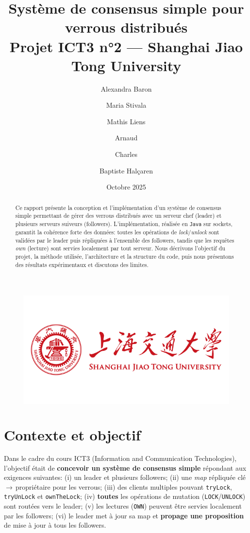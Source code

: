 \documentclass[a4paper,11pt]{article}
\title{Système de consensus simple pour verrous distribués\\\large Projet ICT3 n°2 — Shanghai Jiao Tong University}
\author{Alexandra Baron \and Maria Stivala \and Mathis Liens \and Arnaud \and Charles \and Baptiste Halçaren}
\date{Octobre 2025}
\begin{document}
\begin{figure}[H]
\centering
\includegraphics[width=0.55\linewidth]{shanghai-jiao-tong-university.png}
\end{figure}

\maketitle

\begin{abstract}
Ce rapport présente la conception et l'implémentation d'un système de consensus simple permettant de gérer des verrous distribués avec un serveur chef (leader) et plusieurs serveurs suiveurs (followers). L'implémentation, réalisée en \texttt{Java} sur sockets, garantit la cohérence forte des données: toutes les opérations de \emph{lock}/\emph{unlock} sont validées par le leader puis répliquées à l'ensemble des followers, tandis que les requêtes \emph{own} (lecture) sont servies localement par tout serveur. Nous décrivons l'objectif du projet, la méthode utilisée, l'architecture et la structure du code, puis nous présentons des résultats expérimentaux et discutons des limites.
\end{abstract}

\section{Contexte et objectif}
Dans le cadre du cours ICT3 (Information and Communication Technologies), l'objectif était de \textbf{concevoir un système de consensus simple} répondant aux exigences suivantes: (i) un leader et plusieurs followers; (ii) une \textit{map} répliquée clé\,$\rightarrow$\,propriétaire pour les verrous; (iii) des clients multiples pouvant \texttt{tryLock}, \texttt{tryUnLock} et \texttt{ownTheLock}; (iv) \textbf{toutes} les opérations de mutation (\texttt{LOCK}/\texttt{UNLOCK}) sont routées vers le leader; (v) les lectures (\texttt{OWN}) peuvent être servies localement par les followers; (vi) le leader met à jour sa map et \textbf{propage une proposition} de mise à jour à tous les followers.
\end{document}
